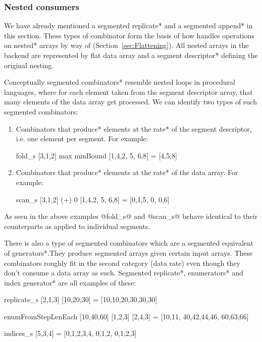 \documentclass[preamble.tex]{subfiles}
\begin{document}
\subsubsection{Nested consumers}

We have already mentioned a \*segmented replicate* and a \*segmented append* in this section. These types of combinator form the basis of how \DPH handles operations on \*nested* arrays by way of  (Section~\ref{sec:Flattening}). All nested arrays in the \DPH backend are represented by flat data array and a \*segment descriptor* defining the original nesting.

Conceptually \*segmented combinators* resemble nested loops in procedural languages, where for each element taken from the segment descriptor array, that many elements of the data array get processed. We can identify two types of such segmented combinators:
\begin{enumerate}
\item Combinators that \*produce* elements at the \*rate* of the segment descriptor, i.e. one element per segment. For example:

\begin{hscode}
fold_s [3,1,2] max minBound [1,4,2, 5, 6,8] = [4,5,8]
\end{hscode}

\item Combinators that \*produce* elements at the \*rate* of the data array. For example:

\begin{hscode}
scan_s [3,1,2] (+) 0 [1,4,2, 5, 6,8] = [0,1,5, 0, 0,6]
\end{hscode}
\end{enumerate}

As seen in the above examples @fold_s@ and @scan_s@ behave identical to their  counterparts as applied to individual segments.

There is also a type of segmented combinators which are a segmented equivalent of \*generators*.\igencomb They produce segmented arrays given certain input arrays. These combinators roughly fit in the second category (data rate) even though they don't consume a data array as such. \*Segmented replicate*, \*enumerators* and \*index generator* are all examples of these:

\begin{hscode}
replicate_s [2,1,3] [10,20,30] = [10,10,20,30,30,30]

enumFromStepLenEach [10,40,60] [1,2,3] [2,4,3] = [10,11, 40,42,44,46, 60,63,66]

indices_s [5,3,4] = [0,1,2,3,4, 0,1,2, 0,1,2,3]
\end{hscode}
\end{document}
